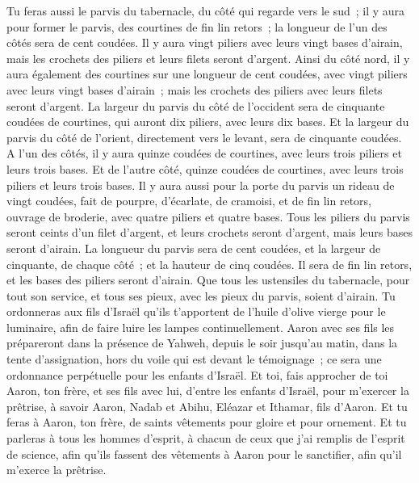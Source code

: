 \begin{multicols}{2}
Tu feras aussi le parvis du tabernacle, du côté qui regarde vers le sud~; il y aura pour former le parvis, des courtines de fin lin retors~; la longueur de l'un des côtés sera de cent coudées.
Il y aura vingt piliers avec leurs vingt bases d'airain, mais les crochets des piliers et leurs filets seront d'argent.
Ainsi du côté nord, il y aura également des courtines sur une longueur de cent coudées, avec vingt piliers avec leurs vingt bases d'airain~; mais les crochets des piliers avec leurs filets seront d'argent.
La largeur du parvis du côté de l'occident sera de cinquante coudées de courtines, qui auront dix piliers, avec leurs dix bases.
Et la largeur du parvis du côté de l'orient, directement vers le levant, sera de cinquante coudées.
A l'un des côtés, il y aura quinze coudées de courtines, avec leurs trois piliers et leurs trois bases.
Et de l'autre côté, quinze coudées de courtines, avec leurs trois piliers et leurs trois bases.
Il y aura aussi pour la porte du parvis un rideau de vingt coudées, fait de pourpre, d'écarlate, de cramoisi, et de fin lin retors, ouvrage de broderie, avec quatre piliers et quatre bases.
Tous les piliers du parvis seront ceints d'un filet d'argent, et leurs crochets seront d'argent, mais leurs bases seront d'airain.
La longueur du parvis sera de cent coudées, et la largeur de cinquante, de chaque côté~; et la hauteur de cinq coudées. Il sera de fin lin retors, et les bases des piliers seront d'airain.
Que tous les ustensiles du tabernacle, pour tout son service, et tous ses pieux, avec les pieux du parvis, soient d'airain.
Tu ordonneras aux fils d'Israël qu'ils t'apportent de l'huile d'olive vierge pour le luminaire, afin de faire luire les lampes continuellement.
Aaron avec ses fils les prépareront dans la présence de Yahweh, depuis le soir jusqu'au matin, dans la tente d'assignation, hors du voile qui est devant le témoignage~; ce sera une ordonnance perpétuelle pour les enfants d'Israël.
\VerseOne{}Et toi, fais approcher de toi Aaron, ton frère, et ses fils avec lui, d'entre les enfants d'Israël, pour m'exercer la prêtrise, à savoir Aaron, Nadab et Abihu, Eléazar et Ithamar, fils d'Aaron.
Et tu feras à Aaron, ton frère, de saints vêtements pour gloire et pour ornement.
Et tu parleras à tous les hommes d'esprit, à chacun de ceux que j'ai remplis de l'esprit de science, afin qu'ils fassent des vêtements à Aaron pour le sanctifier, afin qu'il m'exerce la prêtrise.

\end{multicols}
